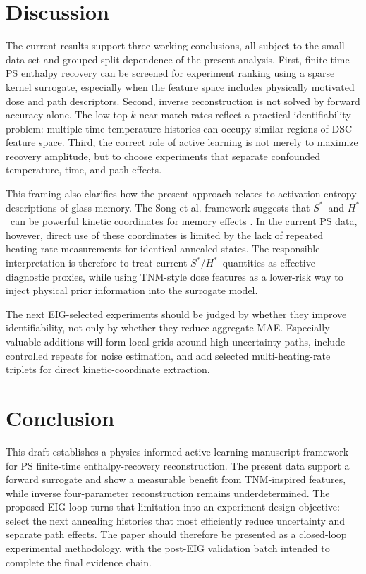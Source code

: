 \documentclass[11pt]{article}
\newcommand{\Sstar}{\ensuremath{S^{\ast}}}
\newcommand{\Hstar}{\ensuremath{H^{\ast}}}
\begin{document}
\section{Discussion}
The current results support three working conclusions, all subject to the small data set and grouped-split dependence of the present analysis. First, finite-time PS enthalpy recovery can be screened for experiment ranking using a sparse kernel surrogate, especially when the feature space includes physically motivated dose and path descriptors. Second, inverse reconstruction is not solved by forward accuracy alone. The low top-$k$ near-match rates reflect a practical identifiability problem: multiple time-temperature histories can occupy similar regions of DSC feature space. Third, the correct role of active learning is not merely to maximize recovery amplitude, but to choose experiments that separate confounded temperature, time, and path effects.

This framing also clarifies how the present approach relates to activation-entropy descriptions of glass memory. The Song et al. framework suggests that \Sstar\ and \Hstar\ can be powerful kinetic coordinates for memory effects \citep{song2020activation}. In the current PS data, however, direct use of these coordinates is limited by the lack of repeated heating-rate measurements for identical annealed states. The responsible interpretation is therefore to treat current \Sstar/\Hstar\ quantities as effective diagnostic proxies, while using TNM-style dose features as a lower-risk way to inject physical prior information into the surrogate model.

The next EIG-selected experiments should be judged by whether they improve identifiability, not only by whether they reduce aggregate MAE. Especially valuable additions will form local grids around high-uncertainty paths, include controlled repeats for noise estimation, and add selected multi-heating-rate triplets for direct kinetic-coordinate extraction.

\section{Conclusion}
This draft establishes a physics-informed active-learning manuscript framework for PS finite-time enthalpy-recovery reconstruction. The present data support a forward surrogate and show a measurable benefit from TNM-inspired features, while inverse four-parameter reconstruction remains underdetermined. The proposed EIG loop turns that limitation into an experiment-design objective: select the next annealing histories that most efficiently reduce uncertainty and separate path effects. The paper should therefore be presented as a closed-loop experimental methodology, with the post-EIG validation batch intended to complete the final evidence chain.
\end{document}
